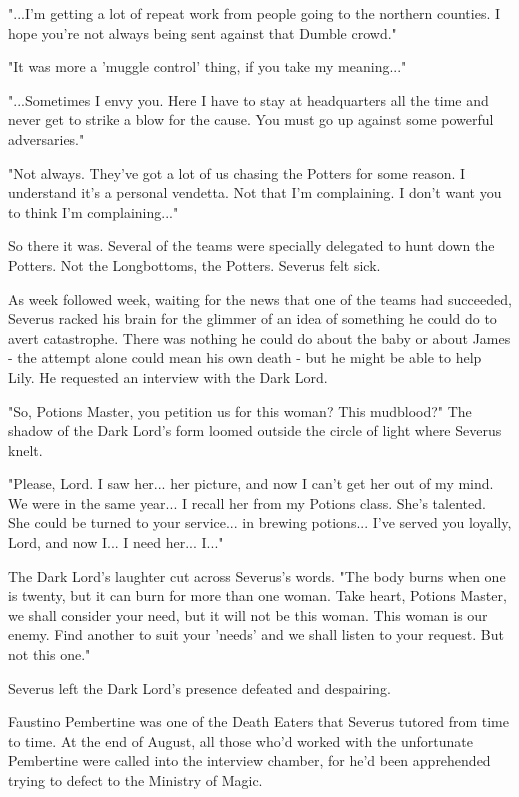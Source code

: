 \documentclass[a4paper,11pt]{article}
\begin{document}
"...I'm getting a lot of repeat work from people going to the northern counties. I hope you're not always being sent against that Dumble crowd."

"It was more a 'muggle control' thing, if you take my meaning..."

"...Sometimes I envy you. Here I have to stay at headquarters all the time and never get to strike a blow for the cause. You must go up against some powerful adversaries."

"Not always. They've got a lot of us chasing the Potters for some reason. I understand it's a personal vendetta. Not that I'm complaining. I don't want you to think I'm complaining..."

So there it was. Several of the teams were specially delegated to hunt down the Potters. Not the Longbottoms, the Potters. Severus felt sick.

As week followed week, waiting for the news that one of the teams had succeeded, Severus racked his brain for the glimmer of an idea of something he could do to avert catastrophe. There was nothing he could do about the baby or about James - the attempt alone could mean his own death - but he might be able to help Lily. He requested an interview with the Dark Lord.

"So, Potions Master, you petition us for this woman? This mudblood?" The shadow of the Dark Lord's form loomed outside the circle of light where Severus knelt.

"Please, Lord. I saw her... her picture, and now I can't get her out of my mind. We were in the same year... I recall her from my Potions class. She's talented. She could be turned to your service... in brewing potions... I've served you loyally, Lord, and now I... I need her... I..."

The Dark Lord's laughter cut across Severus's words. "The body burns when one is twenty, but it can burn for more than one woman. Take heart, Potions Master, we shall consider your need, but it will not be this woman. This woman is our enemy. Find another to suit your 'needs' and we shall listen to your request. But not this one."

Severus left the Dark Lord's presence defeated and despairing.

Faustino Pembertine was one of the Death Eaters that Severus tutored from time to time. At the end of August, all those who'd worked with the unfortunate Pembertine were called into the interview chamber, for he'd been apprehended trying to defect to the Ministry of Magic.
\end{document}

